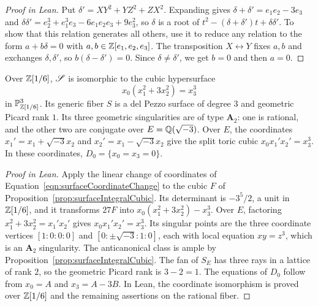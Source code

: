\begin{proof}[Proof in Lean]

\leanok

Put $\delta'=XY^2+YZ^2+ZX^2$. Expanding gives $\delta+\delta'=e_1e_2-3e_3$ and $\delta\delta'=e_2^3+e_1^3e_3-6e_1e_2e_3+9e_3^2$, so $\delta$ is a root of $t^2-(\delta+\delta')t+\delta\delta'$. To show that this relation generates all others, use it to reduce any relation to the form $a+b\delta=0$ with $a,b\in\mathbb{Z}[e_1,e_2,e_3]$. The transposition $X\leftrightarrow Y$ fixes $a,b$ and exchanges $\delta,\delta'$, so $b(\delta-\delta')=0$. Since $\delta\neq\delta'$, we get $b=0$ and then $a=0$.

\end{proof}

\begin{proposition}

\label{prop:surfaceRationalForm}


\leanok



 Over $\mathbb{Z}[1/6]$, $\mathscr{S}$ is isomorphic to the cubic hypersurface \begin{equation*} x_0(x_1^2+3x_2^2)=x_3^3 \end{equation*} in $\mathbb{P}_{\mathbb{Z}[1/6]}^3$. Its generic fiber $S$ is a del Pezzo surface of degree $3$ and geometric Picard rank $1$. Its three geometric singularities are of type $\mathbf A_2$: one is rational, and the other two are conjugate over $E=\mathbb{Q}(\sqrt{-3})$. Over $E$, the coordinates $x_1'=x_1+\sqrt{-3}x_2$ and $x_2'=x_1-\sqrt{-3}x_2$ give the split toric cubic $x_0x_1'x_2'=x_3^3$. In these coordinates, $D_0=\{x_0=x_3=0\}$. 

\end{proposition}

\begin{proof}[Proof in Lean]

\leanok


Apply the linear change of coordinates of Equation~\ref{eqn:surfaceCoordinateChange} to the cubic $F$ of Proposition~\ref{prop:surfaceIntegralCubic}. Its determinant is $-3^5/2$, a unit in $\mathbb{Z}[1/6]$, and it transforms $27F$ into $x_0(x_1^2+3x_2^2)-x_3^3$. Over $E$, factoring $x_1^2+3x_2^2=x_1'x_2'$ gives $x_0x_1'x_2'=x_3^3$. Its singular points are the three coordinate vertices $[1:0:0:0]$ and $[0:\pm\sqrt{-3}:1:0]$, each with local equation $xy=z^3$, which is an $\mathbf A_2$ singularity. The anticanonical class is ample by Proposition~\ref{prop:surfaceIntegralCubic}. The fan of $S_E$ has three rays in a lattice of rank $2$, so the geometric Picard rank is $3-2=1$. The equations of $D_0$ follow from $x_0=A$ and $x_3=A-3B$. In Lean, the coordinate isomorphism is proved over $\mathbb{Z}[1/6]$ and the remaining assertions on the rational fiber.

\end{proof}

